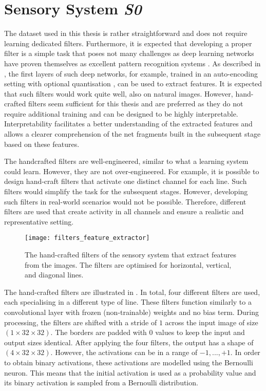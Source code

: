 \section{Sensory System \emph{S0}}
The dataset used in this thesis is rather straightforward and does not require learning dedicated filters.
Furthermore, it is expected that developing a proper filter is a simple task that poses not many challenges as deep learning networks have proven themselves as excellent pattern recognition systems .
As described in , the first layers of such deep networks, for example, trained in an auto-encoding setting  with optional quantisation , can be used to extract features.
It is expected that such filters would work quite well, also on natural images.
However, hand-crafted filters seem sufficient for this thesis and are preferred as they do not require additional training and can be designed to be highly interpretable. Interpretability facilitates a better understanding of the extracted features and allows a clearer comprehension of the net fragments built in the subsequent stage based on these features. 

The handcrafted filters are well-engineered, similar to what a learning system could learn.
However, they are not over-engineered. For example, it is possible to design hand-craft filters that activate one distinct channel for each line.
Such filters would simplify the task for the subsequent stages.
However, developing such filters in real-world scenarios would not be possible.
Therefore, different filters are used that create activity in all channels and ensure a realistic and representative setting.

\begin{figure}[h]
    \centering
    \texttt{[image: filters\_feature\_extractor]}
    \caption[Hand-crafted filters of the sensory system]{The hand-crafted filters of the sensory system that extract features from the images. The filters are optimised for horizontal, vertical, and diagonal lines.}
\end{figure}

The hand-crafted filters are illustrated in .
In total, four different filters are used, each specialising in a different type of line.
These filters function similarly to a convolutional layer with frozen (non-trainable) weights and no bias term. 
During processing, the filters are shifted with a stride of $1$ across the input image of size $(1 \times 32 \times 32)$. 
The borders are padded with $0$ values to keep the input and output sizes identical.
After applying the four filters, the output has a shape of $(4 \times 32 \times 32)$. 
However, the activations can be in a range of $-1, ..., +1$.
In order to obtain binary activations, these activations are modelled using the Bernoulli neuron.
This means that the initial activation is used as a probability value and its binary activation is sampled from a Bernoulli distribution.


